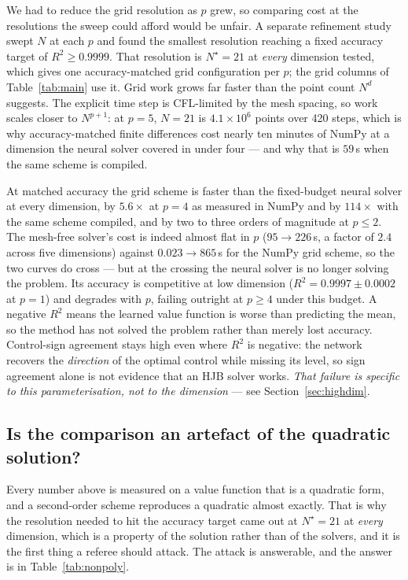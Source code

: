 \documentclass[conference]{IEEEtran}
\begin{document}
We had to reduce the grid resolution as $p$ grew, so comparing cost at the resolutions the sweep
could afford would be unfair. A separate refinement study swept $N$ at each $p$ and found the
smallest resolution reaching a fixed accuracy target of $R^2 \ge 0.9999$. That resolution is
$N^\star = 21$ at \emph{every} dimension tested, which gives one accuracy-matched grid
configuration per $p$; the grid columns of Table~\ref{tab:main} use it. Grid work grows far faster
than the point count $N^d$ suggests. The explicit time step is CFL-limited by the mesh spacing, so work
scales closer to $N^{p+1}$: at $p=5$, $N=21$ is $4.1\times10^6$ points over 420 steps, which is why
accuracy-matched finite differences cost nearly ten minutes of NumPy at a dimension the neural solver
covered in under four --- and why that is $59$\,s when the same scheme is compiled.

At matched accuracy the grid scheme is faster than the fixed-budget neural solver at every
dimension, by $5.6\times$ at $p=4$ as measured in NumPy and by $114\times$ with the same scheme
compiled, and by two to three orders of magnitude at $p \le 2$. The mesh-free solver's cost is indeed almost flat in $p$ ($95 \rightarrow 226$\,s, a factor of $2.4$
across five dimensions) against $0.023 \rightarrow 865$\,s for the NumPy grid scheme, so the two curves
do cross --- but at the crossing the neural solver is no longer solving the problem. Its accuracy
is competitive at low dimension ($R^2 = 0.9997 \pm 0.0002$ at $p=1$) and degrades with $p$,
failing outright at $p \ge 4$ under this budget. A negative $R^2$ means the learned value function
is worse than predicting the mean, so the method has not solved the problem rather than merely lost
accuracy. Control-sign agreement stays high even where $R^2$ is negative: the network recovers the
\emph{direction} of the optimal control while missing its level, so sign agreement alone is not
evidence that an HJB solver works. \emph{That failure is specific to this parameterisation, not to
the dimension} --- see Section~\ref{sec:highdim}.



\subsection{Is the comparison an artefact of the quadratic solution?}\label{sec:nonpoly}

Every number above is measured on a value function that is a quadratic form, and a second-order
scheme reproduces a quadratic almost exactly. That is why the resolution needed to hit the accuracy
target came out at $N^\star = 21$ at \emph{every} dimension, which is a property of the solution
rather than of the solvers, and it is the first thing a referee should attack. The attack is
answerable, and the answer is in Table~\ref{tab:nonpoly}.
\end{document}
